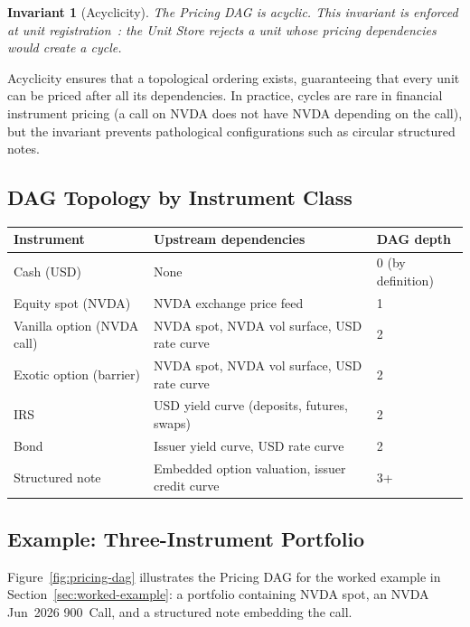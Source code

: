 \documentclass[11pt,a4paper]{article}
\newtheorem{invariant}[definition]{Invariant}
\begin{document}
\begin{invariant}[Acyclicity]
\label{inv:acyclicity}
The Pricing DAG is acyclic.  This invariant is enforced at unit registration~\cite[\S3.4]{ledger}: the Unit Store rejects a unit whose pricing dependencies would create a cycle.
\end{invariant}

\noindent Acyclicity ensures that a topological ordering exists, guaranteeing that every unit can be priced after all its dependencies.  In practice, cycles are rare in financial instrument pricing (a call on NVDA does not have NVDA depending on the call), but the invariant prevents pathological configurations such as circular structured notes.

\subsection{DAG Topology by Instrument Class}

\begin{center}
\small
\begin{tabular}{l l l}
\toprule
\textbf{Instrument} & \textbf{Upstream dependencies} & \textbf{DAG depth} \\
\midrule
Cash (USD) & None & 0 (by definition) \\
Equity spot (NVDA) & NVDA exchange price feed & 1 \\
Vanilla option (NVDA call) & NVDA spot, NVDA vol surface, USD rate curve & 2 \\
Exotic option (barrier) & NVDA spot, NVDA vol surface, USD rate curve & 2 \\
IRS & USD yield curve (deposits, futures, swaps) & 2 \\
Bond & Issuer yield curve, USD rate curve & 2 \\
Structured note & Embedded option valuation, issuer credit curve & 3+ \\
\bottomrule
\end{tabular}
\end{center}

\subsection{Example: Three-Instrument Portfolio}

Figure~\ref{fig:pricing-dag} illustrates the Pricing DAG for the worked example in Section~\ref{sec:worked-example}: a portfolio containing NVDA spot, an NVDA Jun~2026 900~Call, and a structured note embedding the call.
\end{document}
